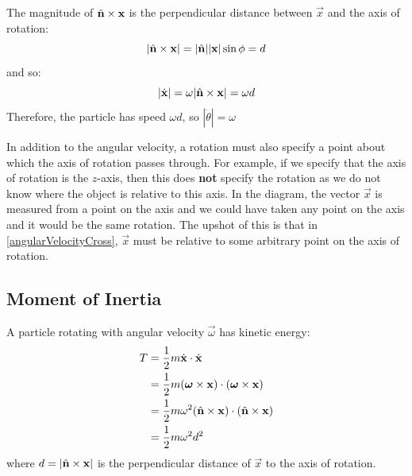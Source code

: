 \documentclass[../main.tex]{subfiles}
\begin{document}
The magnitude of $\hat{\mathbf{\bm{n}}} \times \mathbf{\bm{x}}$ is the perpendicular distance between $\vec{x}$ and the axis of rotation:
\[
  |\hat{\mathbf{\bm{n}}} \times \mathbf{\bm{x}}| = |\hat{\mathbf{\bm{n}}}||\mathbf{\bm{x}}|\sin \phi = d
\]
and so:
\[
  |\dot{\mathbf{\bm{x}}}| = \omega|\hat{\mathbf{\bm{n}}} \times \mathbf{\bm{x}}| = \omega d
\]
Therefore, the particle has speed $\omega d$, so $|\dot{\theta}| = \omega$

In addition to the angular velocity, a rotation must also specify a point about which the axis of rotation passes through.
For example, if we specify that the axis of rotation is the $z$-axis, then this does \textbf{not} specify the rotation as we do not know where the object is relative to this axis.
In the diagram, the vector $\vec{x}$ is measured from a point on the axis and we could have taken any point on the axis and it would be the same rotation.
The upshot of this is that in \cref{angularVelocityCross}, $\vec{x}$ must be relative to some arbitrary point on the axis of rotation.
\subsection{Moment of Inertia}
A particle rotating with angular velocity $\vec{\omega}$ has kinetic energy:
\begin{align*}
  T &= \frac{1}{2} m\dot{\mathbf{\bm{x}}} \cdot \dot{\mathbf{\bm{x}}} \\
    &= \frac{1}{2} m(\mathbf{\bm{\omega}} \times \mathbf{\bm{x}}) \cdot (\mathbf{\bm{\omega}} \times \mathbf{\bm{x}}) \\
    &= \frac{1}{2} m \omega^2 (\hat{\mathbf{\bm{n}}} \times \mathbf{\bm{x}}) \cdot (\hat{\mathbf{\bm{n}}} \times \mathbf{\bm{x}}) \\
    &= \frac{1}{2} m \omega^2 d^2
\end{align*}
where $d = |\hat{\mathbf{\bm{n}}} \times \mathbf{\bm{x}}|$ is the perpendicular distance of $\vec{x}$ to the axis of rotation.
\end{document}
